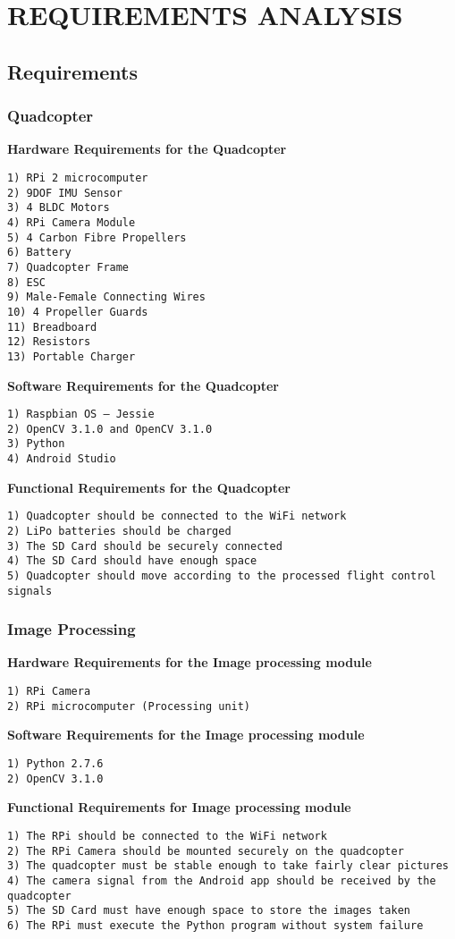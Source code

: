 
\chapter{REQUIREMENTS ANALYSIS} %

\section{Requirements}
\subsection{Quadcopter}
\noindent
\textbf {Hardware Requirements for the Quadcopter}
\begin{verbatim}
1) RPi 2 microcomputer
2) 9DOF IMU Sensor
3) 4 BLDC Motors
4) RPi Camera Module
5) 4 Carbon Fibre Propellers
6) Battery
7) Quadcopter Frame
8) ESC
9) Male-Female Connecting Wires
10) 4 Propeller Guards
11) Breadboard
12) Resistors
13) Portable Charger
\end{verbatim}
\textbf{Software Requirements for the Quadcopter}
\begin{verbatim}
1) Raspbian OS – Jessie
2) OpenCV 3.1.0 and OpenCV 3.1.0
3) Python
4) Android Studio
\end{verbatim}
\textbf{Functional Requirements for the Quadcopter}
\begin{verbatim}
1) Quadcopter should be connected to the WiFi network
2) LiPo batteries should be charged
3) The SD Card should be securely connected
4) The SD Card should have enough space
5) Quadcopter should move according to the processed flight control signals
\end{verbatim}
\subsection{Image Processing}
\noindent
\textbf{Hardware Requirements for the Image processing module}
\begin{verbatim}
1) RPi Camera
2) RPi microcomputer (Processing unit)
\end{verbatim}
\textbf{Software Requirements for the Image processing module}
\begin{verbatim}
1) Python 2.7.6
2) OpenCV 3.1.0
\end{verbatim}
\textbf{Functional Requirements for Image processing module}
\begin{verbatim}
1) The RPi should be connected to the WiFi network
2) The RPi Camera should be mounted securely on the quadcopter
3) The quadcopter must be stable enough to take fairly clear pictures
4) The camera signal from the Android app should be received by the quadcopter
5) The SD Card must have enough space to store the images taken
6) The RPi must execute the Python program without system failure
\end{verbatim}
